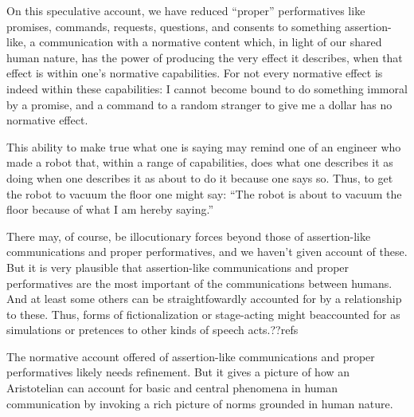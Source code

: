 On this speculative account, we have reduced ``proper'' performatives like promises, commands, requests, questions, and consents to something
assertion-like, a communication with a normative content which, in light of our shared human nature, has the
power of producing the very effect it describes, when that effect is within one's normative capabilities.
For not every normative effect is indeed within these capabilities: I cannot become bound to do something 
immoral by a promise, and a command to a random stranger to give me a dollar has no normative effect.
 
This ability to make true what one is saying may remind one of an engineer who made a robot that, within a 
range of capabilities, does what one describes it as doing when one describes it as about to do it because one says
so. Thus, to get the robot to vacuum the floor one might say: ``The robot is about to vacuum the floor because of
what I am hereby saying.''

There may, of course, be illocutionary forces beyond those of assertion-like communications and proper performatives, 
and we haven't given account of these. But it is very plausible that assertion-like communications and proper performatives are
the most important of the communications between humans. And at least some others can be straightfowardly accounted
for by a relationship to these. Thus, forms of
fictionalization or stage-acting might beaccounted for as simulations or
pretences to other kinds of speech acts.??refs

The normative account offered of assertion-like communications and proper performatives likely needs refinement.
But it gives a picture of how an Aristotelian can account for basic and central phenomena in human communication
by invoking a rich picture of norms grounded in human nature.

